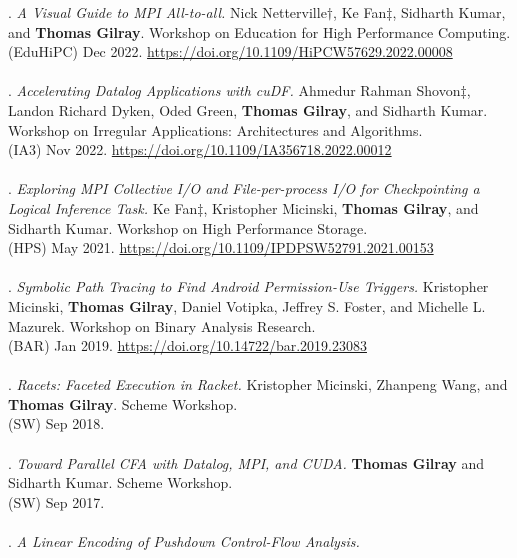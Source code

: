 \paper. \textit{A Visual Guide to MPI All-to-all.}
Nick Netterville$\dagger$, Ke Fan$\ddagger$, Sidharth Kumar, and \textbf{Thomas Gilray}.
Workshop on Education for High Performance Computing.
\\(EduHiPC) Dec 2022. \url{https://doi.org/10.1109/HiPCW57629.2022.00008}
\\ \vspace{-0.1cm}\\
\paper. \textit{Accelerating Datalog Applications with cuDF.}
Ahmedur Rahman Shovon$\ddagger$, Landon Richard Dyken, Oded Green, \textbf{Thomas Gilray}, and Sidharth Kumar.
Workshop on Irregular Applications: Architectures and Algorithms.
\\(IA3) Nov 2022. \url{https://doi.org/10.1109/IA356718.2022.00012}
\\ \vspace{-0.1cm}\\
\paper. \textit{Exploring MPI Collective I/O and File-per-process I/O for Checkpointing a Logical Inference Task.}
Ke Fan$\ddagger$, Kristopher Micinski, \textbf{Thomas Gilray}, and Sidharth Kumar.
Workshop on High Performance Storage.
\\(HPS) May 2021. \url{https://doi.org/10.1109/IPDPSW52791.2021.00153}
\\ \vspace{-0.1cm}\\
\paper. \textit{Symbolic Path Tracing to Find Android Permission-Use Triggers.}
Kristopher Micinski, \textbf{Thomas Gilray}, Daniel Votipka, Jeffrey S. Foster, and Michelle L. Mazurek.
Workshop on Binary Analysis Research.
\\(BAR) Jan 2019. \url{https://doi.org/10.14722/bar.2019.23083}
\\ \vspace{-0.1cm}\\
\paper. \textit{Racets: Faceted Execution in Racket.}
Kristopher Micinski, Zhanpeng Wang, and \textbf{Thomas Gilray}.
Scheme Workshop.
\\(SW) Sep 2018.
\\ \vspace{-0.1cm}\\
\paper. \textit{Toward Parallel CFA with Datalog, MPI, and CUDA.}
\textbf{Thomas Gilray} and Sidharth Kumar.
Scheme Workshop.
\\(SW) Sep 2017.
\\ \vspace{-0.1cm}\\
\paper. \textit{A Linear Encoding of Pushdown Control-Flow Analysis.}
